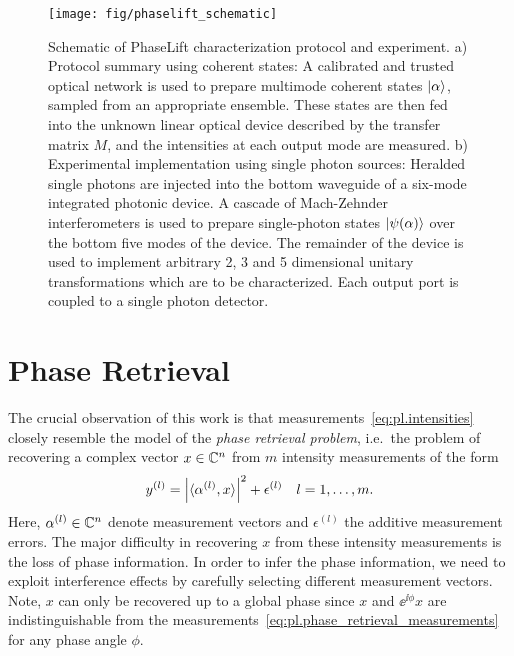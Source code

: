 \begin{figure*}[tbp]
  \centering
  \texttt{[image: fig/phaselift\_schematic]}%
  \caption{%
    \label{fig:pl.experimental.schematic}%
     Schematic of PhaseLift characterization protocol and experiment.
     a) Protocol summary using coherent states:
     A calibrated and trusted optical network is used to prepare multimode coherent states ${|{\alpha}\rangle}$, sampled from an appropriate ensemble.
     These states are then fed into the unknown linear optical device described by the transfer matrix $M$, and the intensities at each output mode are measured.
     b) Experimental implementation using single photon sources:
     Heralded single photons are injected into the bottom waveguide of a six-mode integrated photonic device.
     A cascade of Mach-Zehnder interferometers is used to prepare single-photon states ${|{\psi( \alpha)}\rangle}$ over the bottom five modes of the device.
     The remainder of the device is used to implement arbitrary 2, 3 and 5 dimensional unitary transformations which are to be characterized.
     Each output port is coupled to a single photon detector.
   }
\end{figure*}

\section{Phase Retrieval}%
\label{sec:pl.phase_retrieval}

The crucial observation of this work is that measurements~\eqref{eq:pl.intensities} closely resemble the model of the \textit{phase retrieval problem}, i.e.\ the problem of recovering a complex vector ${x} \in {\mathbb{C}}^n$ from $m$ intensity measurements of the form
\[
  y^{(l)}= {\left\vert\braket{\alpha^{(l)}, x}\right\vert}^2 + \epsilon^{(l)}
  \quad l=1,\ldots,m.
  \label{eq:pl.phase_retrieval_measurements}
\]
Here, $\alpha^{(l)} \in {\mathbb{C}}^n$ denote measurement vectors and $\epsilon^{(l)}$ the additive measurement errors.
The major difficulty in recovering $x$ from these intensity measurements is the loss of phase information.
In order to infer the phase information, we need to exploit interference effects by carefully selecting different measurement vectors.
Note, $x$ can only be recovered up to a global phase since $x$ and $\ee^{\ii\phi} x$ are indistinguishable from the measurements~\eqref{eq:pl.phase_retrieval_measurements} for any phase angle $\phi$.

